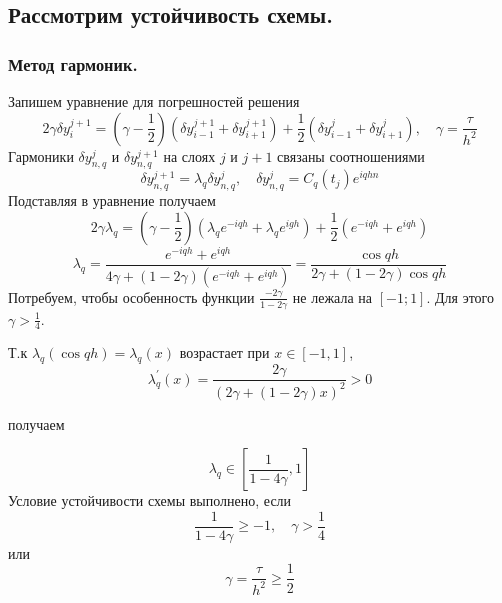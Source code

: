 \documentclass[12pt,a4paper]{article}
\renewcommand{\geq}{\geqslant}
\begin{document}
\subsection{Рассмотрим устойчивость схемы.}

\subsubsection{Метод гармоник.}

Запишем уравнение для погрешностей решения
$$ 2\gamma \delta y_i^{j+1} = (\gamma-\frac{1}{2})(\delta y_{i-1}^{j+1} + \delta y_{i+1}^{j+1}) +\frac{1}{2}(\delta y_{i-1}^j + \delta y_{i+1}^j), \quad \gamma = \frac{\tau}{h^2}$$
Гармоники $\delta y_{n,q}^j$ и $\delta y_{n,q}^{j+1}$ на слоях $j$ и $j+1$ связаны соотношениями
$$\delta y_{n,q}^{j+1} = \lambda_q\delta y_{n,q}^j, \quad \delta y_{n,q}^j = C_q(t_j)e^{iqhn}$$
Подставляя в уравнение получаем
$$2\gamma\lambda_q = (\gamma - \frac{1}{2})(\lambda_q e^{-iqh} + \lambda_q e^{igh}) + \frac{1}{2}(e^{-iqh} + e^{iqh})$$
$$\lambda_q = \frac{e^{-iqh} + e^{iqh}}{4\gamma +(1 - 2\gamma)(e^{-iqh} + e^{iqh})} = \frac{\cos{qh}}{2\gamma +(1 - 2\gamma)\cos{qh}}$$
Потребуем, чтобы особенность функции $\frac{-2\gamma}{1-2\gamma}$ не лежала на $[-1;1]$. Для этого  $\gamma > \frac{1}{4}$.

\begin{flushleft}
 Т.к $\lambda_q(\cos{qh}) = \lambda_q(x)\text{ возрастает при } x\in [-1,1]$, 
 $$\lambda_q ^{'}(x) = \frac{2\gamma}{(2\gamma +(1-2\gamma)x)^2} > 0$$
\begin{flushleft}
получаем
\end{flushleft}
 \end{flushleft} $$\lambda_q \in [\frac{1}{1-4\gamma}, 1]$$
Условие устойчивости схемы выполнено, если 
$$\frac{1}{1-4\gamma}\geq -1, \quad \gamma > \frac{1}{4}$$
или $$\gamma = \frac{\tau}{h^2} \geq \frac{1}{2}$$
\end{document}
